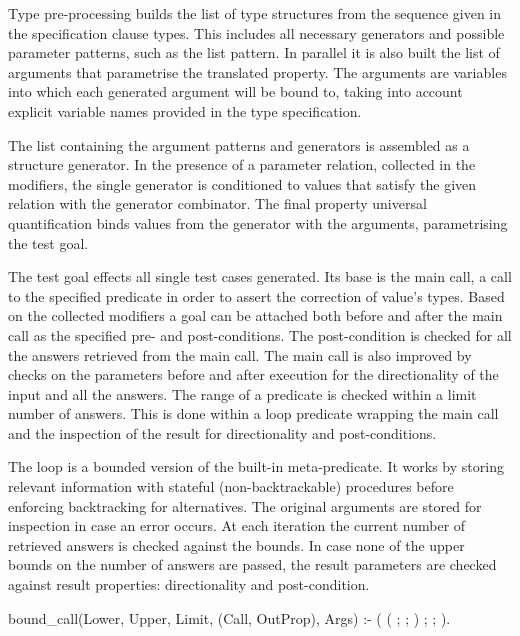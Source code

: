Type pre-processing builds the list of type structures from the sequence
given in the specification clause types.
%
This includes all necessary generators and possible parameter patterns,
such as the list pattern.
%
In parallel it is also built the list of arguments that parametrise the
translated property.
%
The arguments are variables into which each generated argument will be
bound to, taking into account explicit variable names provided in the
type specification.



The list containing the argument patterns and generators is assembled
as a structure generator.
%
In the presence of a parameter relation, collected in the modifiers, the
single generator is conditioned to values that satisfy the given
relation with the  generator combinator.
%
The final property universal quantification binds values from the
generator with the arguments, parametrising the test goal.



The test goal effects all single test cases generated.
%
Its base is the main call, a call to the specified predicate in order to
assert the correction of value's types.
%
Based on the collected modifiers a goal can be attached both before and
after the main call as the specified pre- and post-conditions.
%
The post-condition is checked for all the answers retrieved from the
main call.
%
The main call is also improved by checks on the parameters before and
after execution for the directionality of the input and all the answers.
%
The range of a predicate is checked within a limit number of answers.
%
This is done within a loop predicate wrapping the main call and the
inspection of the result for directionality and post-conditions.


The loop is a bounded version of the  built-in
meta-predicate.
%
It works by storing relevant information with stateful
(non-backtrackable) procedures before enforcing backtracking for
alternatives.
%
The original arguments are stored for inspection in case an error
occurs.
%
At each iteration the current number of retrieved answers is checked
against the bounds.
%
In case none of the upper bounds on the number of answers are passed, the result
parameters are checked against result properties: directionality and
post-condition.
\begin{yapcode}
 bound_call(Lower, Upper, Limit,
            (Call, OutProp), Args) :-
   (
    (
    ;
    ;
    )
   ;
   ;
   ).
\end{yapcode}

